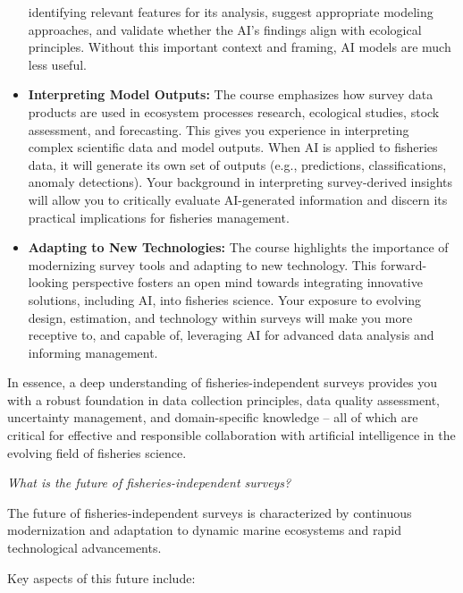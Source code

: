 \documentclass[
  letterpaper,
  oneside,
  open=any]{scrbook}
\begin{document}
\begin{itemize}
  identifying relevant features for its analysis, suggest appropriate
  modeling approaches, and validate whether the AI's findings align with
  ecological principles. Without this important context and framing, AI
  models are much less useful.
\item
  \textbf{Interpreting Model Outputs:} The course emphasizes how survey
  data products are used in ecosystem processes research, ecological
  studies, stock assessment, and forecasting. This gives you experience
  in interpreting complex scientific data and model outputs. When AI is
  applied to fisheries data, it will generate its own set of outputs
  (e.g., predictions, classifications, anomaly detections). Your
  background in interpreting survey-derived insights will allow you to
  critically evaluate AI-generated information and discern its practical
  implications for fisheries management.
\item
  \textbf{Adapting to New Technologies:} The course highlights the
  importance of modernizing survey tools and adapting to new technology.
  This forward-looking perspective fosters an open mind towards
  integrating innovative solutions, including AI, into fisheries
  science. Your exposure to evolving design, estimation, and technology
  within surveys will make you more receptive to, and capable of,
  leveraging AI for advanced data analysis and informing management.
\end{itemize}

In essence, a deep understanding of fisheries-independent surveys
provides you with a robust foundation in data collection principles,
data quality assessment, uncertainty management, and domain-specific
knowledge -- all of which are critical for effective and responsible
collaboration with artificial intelligence in the evolving field of
fisheries science.

\emph{What is the future of fisheries-independent surveys?}

The future of fisheries-independent surveys is characterized by
continuous modernization and adaptation to dynamic marine ecosystems and
rapid technological advancements.

Key aspects of this future include:
\end{document}
